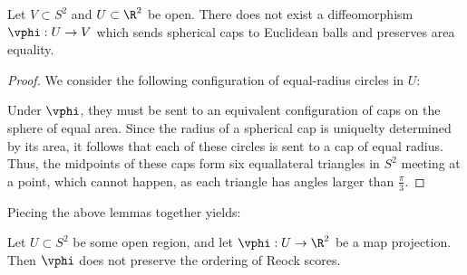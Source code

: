 \begin{lemma}
  Let $V\subset S^2$ and $U\subset \R^2$ be open. There does not exist a 
  diffeomorphism $\vphi:U\to V$ which sends spherical caps 
  to Euclidean balls and preserves area equality.
\end{lemma}
\begin{proof}
  We consider the following configuration of equal-radius circles in $U$:
  \begin{center}
  \end{center}
  Under $\vphi$, they must be sent to an equivalent configuration 
  of caps on the sphere of equal area. Since the radius 
  of a spherical cap is uniquelty determined by its area, it follows 
  that each of these circles is sent to a cap of equal radius. Thus, 
  the midpoints of these caps form six equallateral triangles 
  in $S^2$ meeting at a point, which cannot happen, as each triangle 
  has angles larger than $\frac{\pi}{3}$.
\end{proof}
Piecing the above lemmas together yields:
\begin{theorem}
  Let $U\subset S^2$ be some open region, and let 
  $\vphi:U\to \R^2$ be a map projection. Then 
  $\vphi$ does not preserve the ordering of Reock scores.
\end{theorem}
